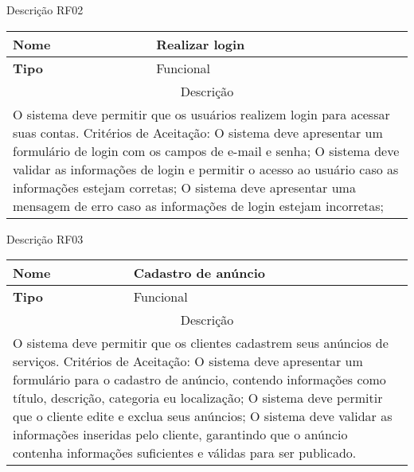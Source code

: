 \begin{quadro}[htb]
	\centering
	\caption{\label{Formatação do texto.}Descrição RF02}	
	\begin{tabular}{|l|p{11cm}|}
		\hline
		\textbf{Nome}    & Realizar login\\ \hline
		\textbf{Tipo}    & Funcional\\ \hline
		\multicolumn{2}{|c|}{Descrição}\\ \hline
		\multicolumn{2}{|p{12cm}|}{
			O sistema deve permitir que os usuários realizem login para acessar suas contas. \newline
			\newline Critérios de Aceitação: \newline
			O sistema deve apresentar um formulário de login com os campos de e-mail e senha; \newline
			\newline O sistema deve validar as informações de login e permitir o acesso ao usuário caso as informações estejam corretas;\newline
			\newline O sistema deve apresentar uma mensagem de erro caso as informações de login estejam incorretas;
			} \\ \hline
	\end{tabular}
\end{quadro}

\begin{quadro}[htb]
	\centering
	\caption{\label{Formatação do texto.}Descrição RF03}	
	\begin{tabular}{|l|p{11cm}|}
		\hline
		\textbf{Nome}    & Cadastro de anúncio\\ \hline
		\textbf{Tipo}    & Funcional\\ \hline
		\multicolumn{2}{|c|}{Descrição}\\ \hline
		\multicolumn{2}{|p{12cm}|}{
			O sistema deve permitir que os clientes cadastrem seus anúncios de serviços. \newline
			\newline Critérios de Aceitação: \newline
			O sistema deve apresentar um formulário para o cadastro de anúncio, contendo informações como título, descrição, categoria eu localização; \newline
			\newline O sistema deve permitir que o cliente edite e exclua seus anúncios;\newline
			\newline O sistema deve validar as informações inseridas pelo cliente, garantindo que o anúncio contenha informações suficientes e válidas para ser publicado.
			} \\ \hline
	\end{tabular}
\end{quadro}

